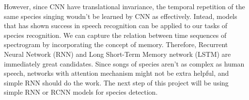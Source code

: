 \documentclass[12pt]{article}
\begin{document}
However, since CNN have translational invariance, the temporal repetition of the same species singing woudn't be learned by CNN as effectively. Intead, models that has shown success in speech recognition can be applied to our tasks of species recognition. We can capture the relation between time sequences of spectrogram by incorporating the concept of memory. Therefore, Recurrent Neural Network (RNN) and Long Short-Term Memory network (LSTM) are immediately great candidates. Since songs of species aren't as complex as human speech, networks with attention mechanism might not be extra helpful, and simple RNN should do the work. The next step of this project will be using simple RNN or RCNN models for species detection. 
\newpage


\end{document}
